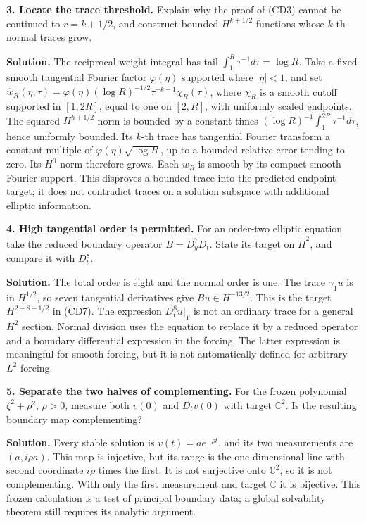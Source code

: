 \documentclass[
  11pt,
]{article}
\begin{document}
\textbf{3. Locate the trace threshold.} Explain why the proof of (CD3)
cannot be continued to \(r=k+1/2\), and construct bounded \(H^{k+1/2}\)
functions whose \(k\)-th normal traces grow.

\textbf{Solution.} The reciprocal-weight integral has tail
\(\int_1^R\tau^{-1}d\tau=\log R\). Take a fixed smooth tangential
Fourier factor \(\varphi(\eta)\) supported where \(|\eta|<1\), and set
\(\widehat w_R(\eta,\tau)=\varphi(\eta)(\log R)^{-1/2}\tau^{-k-1}\chi_R(\tau)\),
where \(\chi_R\) is a smooth cutoff supported in \([1,2R]\), equal to
one on \([2,R]\), with uniformly scaled endpoints. The squared
\(H^{k+1/2}\) norm is bounded by a constant times
\((\log R)^{-1}\int_1^{2R}\tau^{-1}d\tau\), hence uniformly bounded. Its
\(k\)-th trace has tangential Fourier transform a constant multiple of
\(\varphi(\eta)\sqrt{\log R}\), up to a bounded relative error tending
to zero. Its \(H^0\) norm therefore grows. Each \(w_R\) is smooth by its
compact smooth Fourier support. This disproves a bounded trace into the
predicted endpoint target; it does not contradict traces on a solution
subspace with additional elliptic information.

\textbf{4. High tangential order is permitted.} For an order-two
elliptic equation take the reduced boundary operator \(B=D_y^7D_t\).
State its target on \(\bar H^2\), and compare it with \(D_t^8\).

\textbf{Solution.} The total order is eight and the normal order is one.
The trace \(\gamma_1u\) is in \(H^{1/2}\), so seven tangential
derivatives give \(Bu\in H^{-13/2}\). This is the target \(H^{2-8-1/2}\)
in (CD7). The expression \(D_t^8u|_Y\) is not an ordinary trace for a
general \(H^2\) section. Normal division uses the equation to replace it
by a reduced operator and a boundary differential expression in the
forcing. The latter expression is meaningful for smooth forcing, but it
is not automatically defined for arbitrary \(L^2\) forcing.

\textbf{5. Separate the two halves of complementing.} For the frozen
polynomial \(\zeta^2+\rho^2\), \(\rho>0\), measure both \(v(0)\) and
\(D_tv(0)\) with target \(\mathbb C^2\). Is the resulting boundary map
complementing?

\textbf{Solution.} Every stable solution is \(v(t)=a e^{-\rho t}\), and
its two measurements are \((a,i\rho a)\). This map is injective, but its
range is the one-dimensional line with second coordinate \(i\rho\) times
the first. It is not surjective onto \(\mathbb C^2\), so it is not
complementing. With only the first measurement and target \(\mathbb C\)
it is bijective. This frozen calculation is a test of principal boundary
data; a global solvability theorem still requires its analytic argument.
\end{document}
